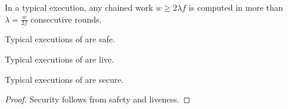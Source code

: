 

\begin{conjecture} \label{lem:patience}
  In a typical execution, any chained work $w \geq 2 \lambda f$ is computed
  in more than $\lambda = \frac{w}{2 f}$ consecutive rounds.
\end{conjecture}

\begin{conjecture}
  Typical executions of \poem are safe.
\end{conjecture}

\begin{conjecture}
  Typical executions of \poem are live.
\end{conjecture}

\begin{corollary}
  Typical executions of \poem are secure.
\end{corollary}
\begin{proof}
  Security follows from safety and liveness.
  \Qed
\end{proof}

